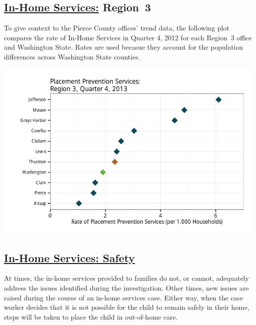 \documentclass{article}\usepackage{graphicx, color}
\makeatletter
\def\maxwidth{ %
  \ifdim\Gin@nat@width>\linewidth
    \linewidth
  \else
    \Gin@nat@width
  \fi
}
\newenvironment{knitrout}{}{} %
\makeatother
\begin{document}
\subsection{\href{http://www.partnersforourchildren.org/child-well-being/visualizations/home-services/trends}
    {In-Home Services:} Region~3
}
To give context to the Pierce County offices' trend data, the following plot compares the rate of In-Home Services in Quarter 4, 2012 for each Region~3 office and Washington State. Rates are used becasue they account for the population differences across Washington State counties.
\nopagebreak[3]
\begin{knitrout}
\color{fgcolor}

{\centering \includegraphics[width=\maxwidth]{figure/ihs_context} 

}



\end{knitrout}



\subsection{\href{http://www.partnersforourchildren.org/child-well-being/visualizations/home-services/safety}
    {In-Home Services: Safety}
}
At times, the in-home services provided to families do not, or cannot, adequately address the issues identified during the investigation. Other times, new issues are raised during the course of an in-home services case. Either way, when the case worker decides that it is not possible for the child to remain safely in their home, steps will be taken to place the child in out-of-home care.
\end{document}
